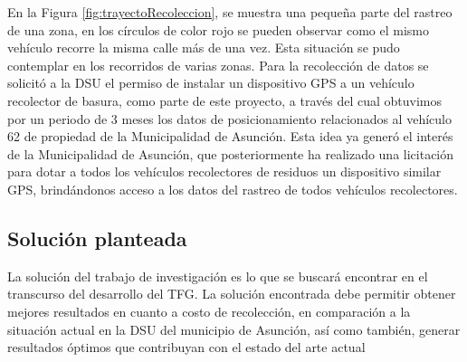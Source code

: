En la Figura \ref{fig:trayectoRecoleccion}, se muestra una pequeña parte del rastreo de una zona, en los círculos de color rojo se pueden observar como el mismo vehículo recorre la misma calle más de una vez. Esta situación se pudo contemplar en los recorridos de varias zonas. Para la recolección de datos se solicitó a la DSU el permiso de instalar un dispositivo GPS a un vehículo recolector de basura, como parte de este proyecto, a través del cual obtuvimos por un periodo de 3 meses los datos de posicionamiento relacionados al vehículo 62 de propiedad de la Municipalidad de Asunción. Esta idea ya generó el interés de la Municipalidad de Asunción, que posteriormente ha realizado una licitación para dotar a todos los vehículos recolectores de residuos un dispositivo similar GPS, brindándonos acceso a los datos del rastreo de todos vehículos recolectores.

\subsection{Solución planteada}

La solución del trabajo de investigación es lo que se buscará encontrar en el transcurso del desarrollo del TFG. La solución encontrada debe permitir obtener mejores resultados en cuanto a costo de recolección, en comparación a la situación actual en la DSU del municipio de Asunción, así como también, generar resultados óptimos que contribuyan con el estado del arte actual












